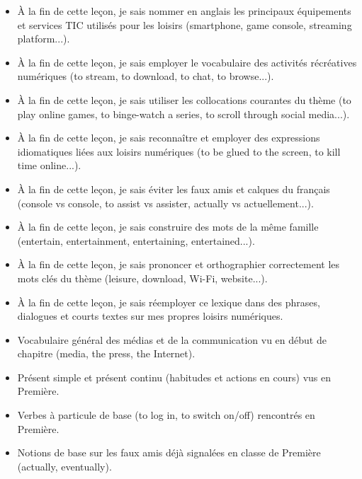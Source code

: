 \documentclass[11pt]{article}
\begin{document}
\begin{objectifs}
\begin{itemize}
\item À la fin de cette leçon, je sais nommer en anglais les principaux équipements et services TIC utilisés pour les loisirs (smartphone, game console, streaming platform...).
\item À la fin de cette leçon, je sais employer le vocabulaire des activités récréatives numériques (to stream, to download, to chat, to browse...).
\item À la fin de cette leçon, je sais utiliser les collocations courantes du thème (to play online games, to binge-watch a series, to scroll through social media...).
\item À la fin de cette leçon, je sais reconnaître et employer des expressions idiomatiques liées aux loisirs numériques (to be glued to the screen, to kill time online...).
\item À la fin de cette leçon, je sais éviter les faux amis et calques du français (console vs console, to assist vs assister, actually vs actuellement...).
\item À la fin de cette leçon, je sais construire des mots de la même famille (entertain, entertainment, entertaining, entertained...).
\item À la fin de cette leçon, je sais prononcer et orthographier correctement les mots clés du thème (leisure, download, Wi-Fi, website...).
\item À la fin de cette leçon, je sais réemployer ce lexique dans des phrases, dialogues et courts textes sur mes propres loisirs numériques.
\end{itemize}
\end{objectifs}

\begin{prerequis}
\begin{itemize}
\item Vocabulaire général des médias et de la communication vu en début de chapitre (media, the press, the Internet).
\item Présent simple et présent continu (habitudes et actions en cours) vus en Première.
\item Verbes à particule de base (to log in, to switch on/off) rencontrés en Première.
\item Notions de base sur les faux amis déjà signalées en classe de Première (actually, eventually).
\end{itemize}
\end{prerequis}
\end{document}
